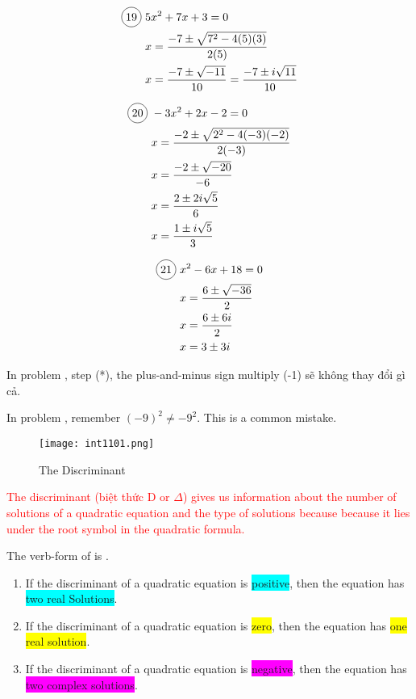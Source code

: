 \begin{multicols}{2}
\begin{align*}
  \circled{19}\ &5x^{2}+7x+3=0\\
  &x=\frac{-7\pm\sqrt{7^{2}-4(5)(3)}}{2(5)}\\
  &x=\frac{-7\pm \sqrt{-11}}{10}=\frac{-7\pm i\sqrt{11}}{10}
\end{align*}

\begin{align*}
  \circled{20}\ &-3x^{2}+2x-2=0\\
  &x=\frac{-2\pm\sqrt{2^{2}-4(-3)(-2)}}{2(-3)}\\
  &x=\frac{-2\pm \sqrt{-20}}{-6}\\
  &x=\frac{2\pm 2i\sqrt{5}}{6}\\
  &x=\frac{1\pm i\sqrt{5}}{3}
\end{align*}

\begin{align*}
  \circled{21}\ &x^{2}-6x+18=0\\
  &x=\frac{6\pm\sqrt{-36}}{2}\\
  &x=\frac{6\pm 6i}{2}\\
  &x=3\pm 3i
\end{align*}
\end{multicols}

In problem , step (*), the plus-and-minus sign multiply (-1) sẽ không thay đổi gì cả.

In problem , remember $(-9)^{2}\neq-9^{2}$. This is a common mistake.

\vspace{.7cm}

\begin{figure}[htb!]
  \centering
  \texttt{[image: int1101.png]}
  \caption{The Discriminant}
\end{figure}

\textcolor{red}{The discriminant (biệt thức D or $\Delta$) gives us information about the number of solutions of a quadratic equation and the type of solutions because because it lies under the root symbol in the quadratic formula.}

The verb-form of  is .

\begin{enumerate}
  \item If the discriminant of a quadratic equation is \colorbox{cyan}{positive}, then the equation has \newline \colorbox{cyan}{two real Solutions}.
  \item  If the discriminant of a quadratic equation is \colorbox{yellow}{zero}, then the equation has \colorbox{yellow}{one real solution}.
  \item If the discriminant of a quadratic equation is \colorbox{magenta}{negative}, then the equation has \newline \colorbox{magenta}{two complex solutions}.
\end{enumerate}
